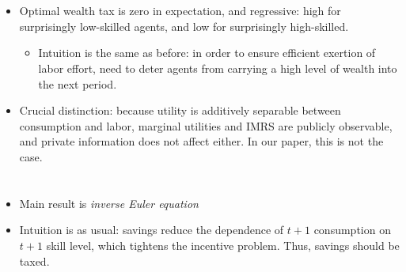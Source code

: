 \documentclass[11pt]{article}
\begin{document}
\section{\cite{kocherlakota2005zero}}
\begin{itemize}
    \item Optimal wealth tax is zero in expectation, and regressive: high for surprisingly low-skilled agents, and low for surprisingly high-skilled. 
    \begin{itemize}
        \item Intuition is the same as before: in order to ensure efficient exertion of labor effort, need to deter agents from carrying a high level of wealth into the next period. 
    \end{itemize}
    \item Crucial distinction: because utility is additively separable between consumption and labor, marginal utilities and IMRS are publicly observable, and private information does not affect either. In our paper, this is not the case. 
\end{itemize}

\section{\cite{golosov2003optimal}} \label{sec:golosov03}
\begin{itemize}
    \item Main result is \textit{inverse Euler equation}
    \item Intuition is as usual: savings reduce the dependence of \( t+1 \) consumption on \( t+1 \) skill level, which tightens the incentive problem. Thus, savings should be taxed.
\end{itemize}
\end{document}
